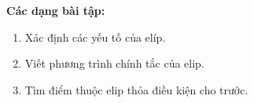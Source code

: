 \documentclass[12pt,a4paper]{article}
\begin{document}
\medskip\noindent\textbf{Các dạng bài tập:}
\begin{enumerate}[label=\textbf{Dạng \arabic*:}, leftmargin=*, align=left]
  \item Xác định các yếu tố của elíp.
  \item Viết phương trình chính tắc của elip.
  \item Tìm điểm thuộc elip thỏa điều kiện cho trước.
\end{enumerate}
\end{document}
